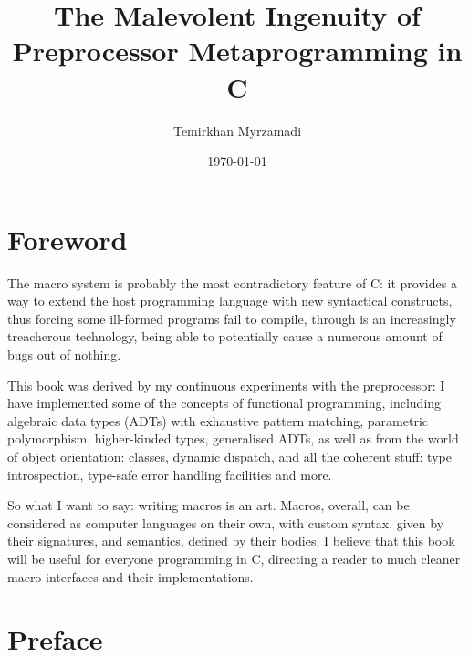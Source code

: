 \documentclass[a4paper, 12pt]{book}
\begin{document}
\title{The Malevolent Ingenuity of Preprocessor Metaprogramming in C}
\author{Temirkhan Myrzamadi}
\date{\today}
\maketitle

\tableofcontents

\newpage

\section{Foreword}

The macro system is probably the most contradictory feature of C: it provides a way to extend
the host programming language with new syntactical constructs, thus forcing some ill-formed programs
fail to compile, through is an increasingly treacherous technology, being able to potentially
cause a numerous amount of bugs out of nothing.

This book was derived by my continuous experiments with the preprocessor: I have implemented some of
the concepts of functional programming, including algebraic data types (ADTs) with exhaustive
pattern matching, parametric polymorphism, higher-kinded types, generalised ADTs, as well as from
the world of object orientation: classes, dynamic dispatch, and all the coherent stuff: type
introspection, type-safe error handling facilities and more.

So what I want to say: writing macros is an art. Macros, overall, can be considered as computer
languages on their own, with custom syntax, given by their signatures, and semantics, defined by
their bodies. I believe that this book will be useful for everyone programming in C, directing a
reader to much cleaner macro interfaces and their implementations.

\newpage

\section{Preface}
\end{document}
